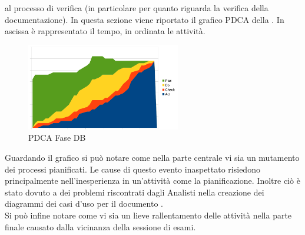 				al processo di verifica (in particolare per quanto riguarda la verifica della documentazione).
			In questa sezione viene riportato il grafico PDCA della . In ascissa è rappresentato il tempo, in ordinata le attività.
			\begin{figure}[H]
				\centering
				\includegraphics[width=0.6\textwidth]{PianoDiQualifica/Pics/GraficoPDCAFaseA.pdf}
				\caption{PDCA Fase DB}
			\end{figure}
			Guardando il grafico si può notare come nella parte centrale vi sia un mutamento dei processi pianificati. Le cause di questo evento 
			inaspettato	risiedono principalmente nell'inesperienza in un'attività come la pianificazione. Inoltre ciò è stato dovuto a dei problemi 
			riscontrati dagli Analisti nella creazione dei diagrammi dei casi d'uso per il documento .\\
			Si può infine notare come vi sia un lieve rallentamento delle attività nella parte finale causato dalla vicinanza della sessione di esami.
